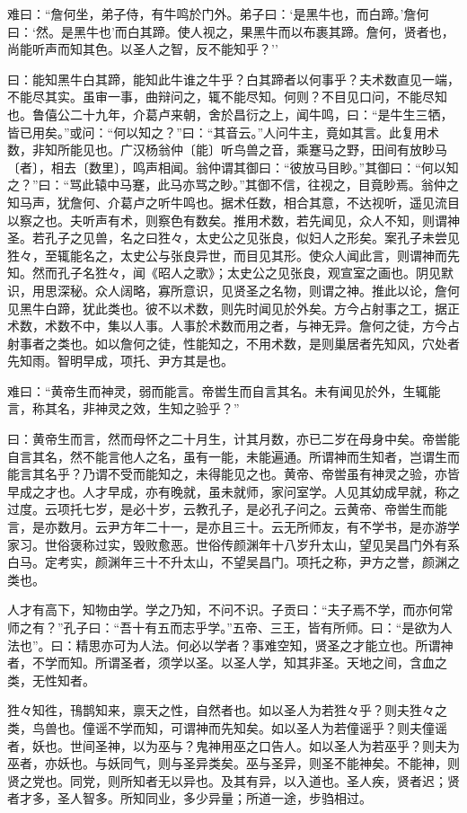 \documentclass[]{article}
\begin{document}
难曰：``詹何坐，弟子侍，有牛鸣於门外。弟子曰：`是黑牛也，而白蹄。'詹何曰：`然。是黑牛也'而白其蹄。使人视之，果黑牛而以布裹其蹄。詹何，贤者也，尚能听声而知其色。以圣人之智，反不能知乎？''

曰：能知黑牛白其蹄，能知此牛谁之牛乎？白其蹄者以何事乎？夫术数直见一端，不能尽其实。虽审一事，曲辩问之，辄不能尽知。何则？不目见口问，不能尽知也。鲁僖公二十九年，介葛卢来朝，舍於昌衍之上，闻牛鸣，曰：``是牛生三牺，皆已用矣。''或问：``何以知之？''曰：``其音云。''人问牛主，竟如其言。此复用术数，非知所能见也。广汉杨翁仲〔能〕听鸟兽之音，乘蹇马之野，田间有放眇马〔者〕，相去〔数里〕，鸣声相闻。翁仲谓其御曰：``彼放马目眇。''其御曰：``何以知之？''曰：``骂此辕中马蹇，此马亦骂之眇。''其御不信，往视之，目竟眇焉。翁仲之知马声，犹詹何、介葛卢之听牛鸣也。据术任数，相合其意，不达视听，遥见流目以察之也。夫听声有术，则察色有数矣。推用术数，若先闻见，众人不知，则谓神圣。若孔子之见兽，名之曰狌々，太史公之见张良，似妇人之形矣。案孔子未尝见狌々，至辄能名之，太史公与张良异世，而目见其形。使众人闻此言，则谓神而先知。然而孔子名狌々，闻《昭人之歌》；太史公之见张良，观宣室之画也。阴见默识，用思深秘。众人阔略，寡所意识，见贤圣之名物，则谓之神。推此以论，詹何见黑牛白蹄，犹此类也。彼不以术数，则先时闻见於外矣。方今占射事之工，据正术数，术数不中，集以人事。人事於术数而用之者，与神无异。詹何之徒，方今占射事者之类也。如以詹何之徒，性能知之，不用术数，是则巢居者先知风，穴处者先知雨。智明早成，项托、尹方其是也。

难曰：``黄帝生而神灵，弱而能言。帝喾生而自言其名。未有闻见於外，生辄能言，称其名，非神灵之效，生知之验乎？''

曰：黄帝生而言，然而母怀之二十月生，计其月数，亦已二岁在母身中矣。帝喾能自言其名，然不能言他人之名，虽有一能，未能遍通。所谓神而生知者，岂谓生而能言其名乎？乃谓不受而能知之，未得能见之也。黄帝、帝喾虽有神灵之验，亦皆早成之才也。人才早成，亦有晚就，虽未就师，家问室学。人见其幼成早就，称之过度。云项托七岁，是必十岁，云教孔子，是必孔子问之。云黄帝、帝喾生而能言，是亦数月。云尹方年二十一，是亦且三十。云无所师友，有不学书，是亦游学家习。世俗褒称过实，毁败愈恶。世俗传颜渊年十八岁升太山，望见吴昌门外有系白马。定考实，颜渊年三十不升太山，不望吴昌门。项托之称，尹方之誉，颜渊之类也。

人才有高下，知物由学。学之乃知，不问不识。子贡曰：``夫子焉不学，而亦何常师之有？''孔子曰：``吾十有五而志乎学。''五帝、三王，皆有所师。曰：``是欲为人法也''。曰：精思亦可为人法。何必以学者？事难空知，贤圣之才能立也。所谓神者，不学而知。所谓圣者，须学以圣。以圣人学，知其非圣。天地之间，含血之类，无性知者。

狌々知徃，鳱鹊知来，禀天之性，自然者也。如以圣人为若狌々乎？则夫狌々之类，鸟兽也。僮谣不学而知，可谓神而先知矣。如以圣人为若僮谣乎？则夫僮谣者，妖也。世间圣神，以为巫与？鬼神用巫之口告人。如以圣人为若巫乎？则夫为巫者，亦妖也。与妖同气，则与圣异类矣。巫与圣异，则圣不能神矣。不能神，则贤之党也。同党，则所知者无以异也。及其有异，以入道也。圣人疾，贤者迟；贤者才多，圣人智多。所知同业，多少异量；所道一途，步驺相过。
\end{document}
